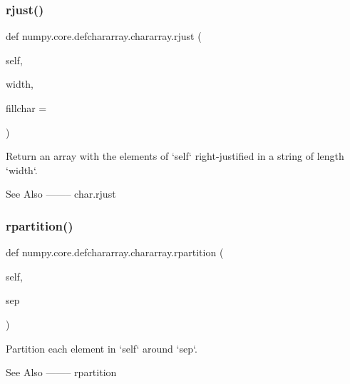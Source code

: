 \subsubsection{\texorpdfstring{rjust()}{rjust()}}
{\footnotesize\ttfamily def numpy.\+core.\+defchararray.\+chararray.\+rjust (\begin{DoxyParamCaption}\item[{}]{self,  }\item[{}]{width,  }\item[{}]{fillchar = {\ttfamily \textquotesingle{}~\textquotesingle{}} }\end{DoxyParamCaption})}

\begin{DoxyVerb}Return an array with the elements of `self`
right-justified in a string of length `width`.

See Also
--------
char.rjust\end{DoxyVerb}
 \mbox{\label{classnumpy_1_1core_1_1defchararray_1_1chararray_a1733ae37a684caf05ac6442a177ccc12}} 
\subsubsection{\texorpdfstring{rpartition()}{rpartition()}}
{\footnotesize\ttfamily def numpy.\+core.\+defchararray.\+chararray.\+rpartition (\begin{DoxyParamCaption}\item[{}]{self,  }\item[{}]{sep }\end{DoxyParamCaption})}

\begin{DoxyVerb}Partition each element in `self` around `sep`.

See Also
--------
rpartition
\end{DoxyVerb}
 \mbox{\label{classnumpy_1_1core_1_1defchararray_1_1chararray_a5b9c5b3a32a2b0a2f9a782f206c08e96}} 
